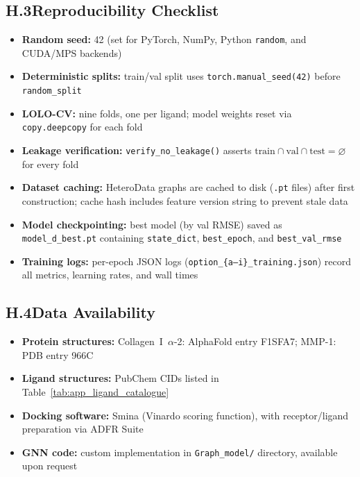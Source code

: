 \documentclass[11pt]{article}
\begin{document}
\subsection*{H.3\quad Reproducibility Checklist}

\begin{itemize}[leftmargin=1.5em]
  \item \textbf{Random seed:} 42 (set for PyTorch, NumPy, Python
    \texttt{random}, and CUDA/MPS backends)
  \item \textbf{Deterministic splits:} train/val split uses
    \texttt{torch.manual\_seed(42)} before \texttt{random\_split}
  \item \textbf{LOLO-CV:} nine folds, one per ligand; model weights
    reset via \texttt{copy.deepcopy} for each fold
  \item \textbf{Leakage verification:}
    \texttt{verify\_no\_leakage()} asserts $\text{train} \cap
    \text{val} \cap \text{test} = \varnothing$ for every fold
  \item \textbf{Dataset caching:} HeteroData graphs are cached to disk
    (\texttt{.pt} files) after first construction; cache hash includes
    feature version string to prevent stale data
  \item \textbf{Model checkpointing:} best model (by val RMSE) saved
    as \texttt{model\_d\_best.pt} containing \texttt{state\_dict},
    \texttt{best\_epoch}, and \texttt{best\_val\_rmse}
  \item \textbf{Training logs:} per-epoch JSON logs
    (\texttt{option\_\{a--i\}\_training.json}) record all metrics,
    learning rates, and wall times
\end{itemize}

\subsection*{H.4\quad Data Availability}

\begin{itemize}[leftmargin=1.5em]
  \item \textbf{Protein structures:}
    Collagen~I~$\alpha$-2: AlphaFold entry F1SFA7;
    MMP-1: PDB entry 966C
  \item \textbf{Ligand structures:}
    PubChem CIDs listed in Table~\ref{tab:app_ligand_catalogue}
  \item \textbf{Docking software:} Smina (Vinardo scoring function),
    with receptor/ligand preparation via ADFR Suite
  \item \textbf{GNN code:} custom implementation in
    \texttt{Graph\_model/} directory, available upon request
\end{itemize}
\end{document}
